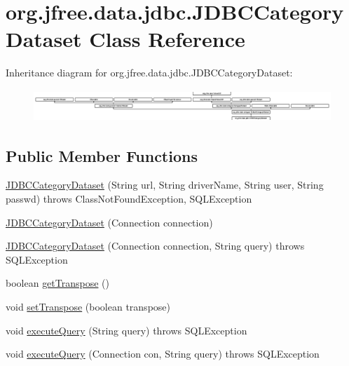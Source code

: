 \hypertarget{classorg_1_1jfree_1_1data_1_1jdbc_1_1_j_d_b_c_category_dataset}{}\section{org.\+jfree.\+data.\+jdbc.\+J\+D\+B\+C\+Category\+Dataset Class Reference}
\label{classorg_1_1jfree_1_1data_1_1jdbc_1_1_j_d_b_c_category_dataset}
Inheritance diagram for org.\+jfree.\+data.\+jdbc.\+J\+D\+B\+C\+Category\+Dataset\+:\begin{figure}[H]
\begin{center}
\leavevmode
\includegraphics[height=1.211073cm]{classorg_1_1jfree_1_1data_1_1jdbc_1_1_j_d_b_c_category_dataset}
\end{center}
\end{figure}
\subsection*{Public Member Functions}
\begin{DoxyCompactItemize}
\item 
\mbox{\hyperlink{classorg_1_1jfree_1_1data_1_1jdbc_1_1_j_d_b_c_category_dataset_a32154c8bf58ca7479d33f14131c34a3b}{J\+D\+B\+C\+Category\+Dataset}} (String url, String driver\+Name, String user, String passwd)  throws Class\+Not\+Found\+Exception, S\+Q\+L\+Exception 
\item 
\mbox{\hyperlink{classorg_1_1jfree_1_1data_1_1jdbc_1_1_j_d_b_c_category_dataset_ab55a6e05b7e40a24a0ba9a453fb2bb04}{J\+D\+B\+C\+Category\+Dataset}} (Connection connection)
\item 
\mbox{\hyperlink{classorg_1_1jfree_1_1data_1_1jdbc_1_1_j_d_b_c_category_dataset_a130761231d8b73f6e6081ee87fb249dd}{J\+D\+B\+C\+Category\+Dataset}} (Connection connection, String query)  throws S\+Q\+L\+Exception 
\item 
boolean \mbox{\hyperlink{classorg_1_1jfree_1_1data_1_1jdbc_1_1_j_d_b_c_category_dataset_af119519811886f662cb823bdf5c3a154}{get\+Transpose}} ()
\item 
void \mbox{\hyperlink{classorg_1_1jfree_1_1data_1_1jdbc_1_1_j_d_b_c_category_dataset_a55b7021af40abd87ba5f54623da2174d}{set\+Transpose}} (boolean transpose)
\item 
void \mbox{\hyperlink{classorg_1_1jfree_1_1data_1_1jdbc_1_1_j_d_b_c_category_dataset_a9c414ca370a469776e84b4c27a587243}{execute\+Query}} (String query)  throws S\+Q\+L\+Exception 
\item 
void \mbox{\hyperlink{classorg_1_1jfree_1_1data_1_1jdbc_1_1_j_d_b_c_category_dataset_a7201f716b99ad1e92b30d07453ba14f7}{execute\+Query}} (Connection con, String query)  throws S\+Q\+L\+Exception 
\end{DoxyCompactItemize}
